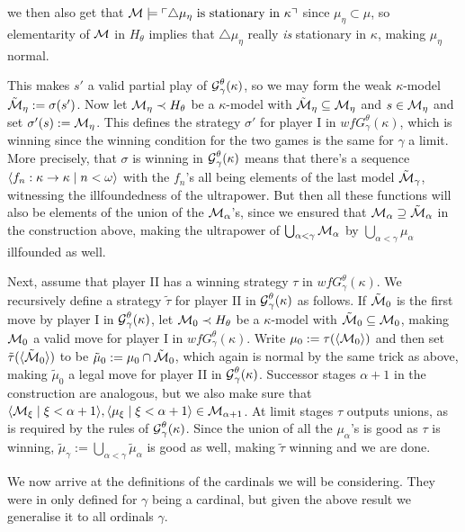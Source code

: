 \documentclass[../../main]{subfiles}
\begin{document}
{{		we then also get that $\operatorname{\mathcal M}\models\ulcorner \triangle\mu_\eta\text{ is stationary in $\kappa$} \urcorner$ since $\mu_\eta\subset\mu$, so elementarity of $\operatorname{\mathcal M}$ in $H_\theta$ implies that $\triangle\mu_\eta$ really \textit{is} stationary in $\kappa$, making $\mu_\eta$ normal.
	}
	
	This makes $s'$ a valid partial play of $\operatorname{\mathcal G}_\gamma^\theta(\kappa)$, so we may form the weak $\kappa$-model $\tilde{\operatorname{\mathcal M}}_\eta:=\sigma(s')$. Now let $\operatorname{\mathcal M}_\eta\prec H_\theta$ be a $\kappa$-model with $\tilde{\operatorname{\mathcal M}}_\eta\subseteq\operatorname{\mathcal M}_\eta$ and $s\in\operatorname{\mathcal M}_\eta$ and set $\sigma'(s):=\operatorname{\mathcal M}_\eta$. This defines the strategy $\sigma'$ for player I in $wfG_\gamma^\theta(\kappa)$, which is winning since the winning condition for the two games is the same for $\gamma$ a limit. More precisely, that $\sigma$ is winning in $\operatorname{\mathcal G}_\gamma^\theta(\kappa)$ means that there's a sequence $\langle f_n:\kappa\to\kappa\mid n<\omega\rangle$ with the $f_n$'s all being elements of the last model $\tilde{\operatorname{\mathcal M}}_\gamma$, witnessing the illfoundedness of the ultrapower. But then all these functions will also be elements of the union of the $\operatorname{\mathcal M}_\alpha$'s, since we ensured that $\operatorname{\mathcal M}_\alpha\supseteq\tilde{\operatorname{\mathcal M}}_\alpha$ in the construction above, making the ultrapower of $\bigcup_{\alpha<\gamma}\operatorname{\mathcal M}_\alpha$ by $\bigcup_{\alpha<\gamma}\mu_\alpha$ illfounded as well.

	\qquad Next, assume that player II has a winning strategy $\tau$ in $wfG_\gamma^\theta(\kappa)$. We recursively define a strategy $\tilde\tau$ for player II in $\operatorname{\mathcal G}_\gamma^\theta(\kappa)$ as follows. If $\tilde{\operatorname{\mathcal M}}_0$ is the first move by player I in $\operatorname{\mathcal G}_\gamma^\theta(\kappa)$, let $\operatorname{\mathcal M}_0\prec H_\theta$ be a $\kappa$-model with $\tilde{\operatorname{\mathcal M}}_0\subseteq\operatorname{\mathcal M}_0$, making $\operatorname{\mathcal M}_0$ a valid move for player I in $wfG_\gamma^\theta(\kappa)$. Write $\mu_0:=\tau(\langle \operatorname{\mathcal M}_0\rangle)$ and then set $\tilde\tau(\langle \tilde{\operatorname{\mathcal M}}_0\rangle)$ to be $\tilde\mu_0:=\mu_0\cap\tilde{\operatorname{\mathcal M}}_0$, which again is normal by the same trick as above, making $\tilde\mu_0$ a legal move for player II in $\operatorname{\mathcal G}_\gamma^\theta(\kappa)$. Successor stages $\alpha+1$ in the construction are analogous, but we also make sure that $\langle \operatorname{\mathcal M}_\xi\mid\xi<\alpha+1\rangle,\langle \mu_\xi\mid\xi<\alpha+1\rangle\in\operatorname{\mathcal M}_{\alpha+1}$. At limit stages $\tau$ outputs unions, as is required by the rules of $\operatorname{\mathcal G}_\gamma^\theta(\kappa)$. Since the union of all the $\mu_\alpha$'s is good as $\tau$ is winning, $\tilde\mu_\gamma:=\bigcup_{\alpha<\gamma}\tilde\mu_\alpha$ is good as well, making $\tilde\tau$ winning and we are done.
}

We now arrive at the definitions of the cardinals we will be considering. They were in \cite{HolySchlicht} only defined for $\gamma$ being a cardinal, but given the above result we generalise it to all ordinals $\gamma$.
\end{document}
